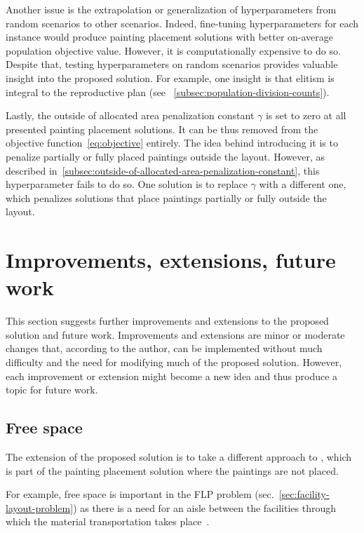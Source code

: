 Another issue is the extrapolation or generalization of hyperparameters from random scenarios to other scenarios.
Indeed, fine-tuning hyperparameters for each instance would produce painting placement solutions with better on-average population objective value.
However, it is computationally expensive to do so.
Despite that, testing hyperparameters on random scenarios provides valuable insight into the proposed solution.
For example, one insight is that elitism is integral to the reproductive plan (see ~\ref{subsec:population-division-counts}).

Lastly, the outside of allocated area penalization constant $\gamma$ is set to zero at all presented painting placement solutions.
It can be thus removed from the objective function~\ref{eq:objective} entirely.
The idea behind introducing it is to penalize partially or fully placed paintings outside the layout.
However, as described in~\ref{subsec:outside-of-allocated-area-penalization-constant}, this hyperparameter fails to do so.
One solution is to replace $\gamma$ with a different one,
which penalizes solutions that place paintings partially or fully outside the layout.


\section{Improvements, extensions, future work}\label{sec:improvements}
This section suggests further improvements and extensions to the proposed solution
and future work.
Improvements and extensions are minor or moderate changes that, according to the author,
can be implemented without much difficulty and the need for modifying
much of the proposed solution.
However, each improvement or extension might become a new idea and thus produce a topic for future work.

\subsection{Free space}\label{subsec:free-space}

The extension of the proposed solution is to take a different approach to
, which is part of the painting placement solution where the paintings are not placed.

For example, free space is important in the FLP problem (sec.~\ref{sec:facility-layout-problem})
as there is a need for an aisle between the facilities
through which the material transportation takes place~\cite{scholzExtensionsSTaTSPractical2010}.


